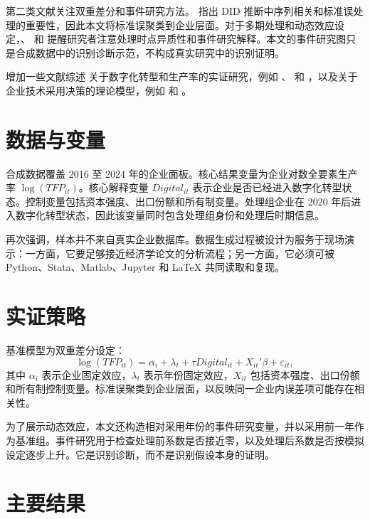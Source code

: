 \documentclass[11pt]{ctexart}
\begin{document}
第二类文献关注双重差分和事件研究方法。\citet{BertrandDufloMullainathan2004} 指出 DID 推断中序列相关和标准误处理的重要性，因此本文将标准误聚类到企业层面。对于多期处理和动态效应设定，\citet{CallawaySantAnna2021}、\citet{SunAbraham2021} 和 \citet{GoodmanBacon2021} 提醒研究者注意处理时点异质性和事件研究解释。本文的事件研究图只是合成数据中的识别诊断示范，不构成真实研究中的识别证明。

增加一些文献综述 关于数字化转型和生产率的实证研究，例如 \citet{BrynjolfssonHitt2000}、\citet{AutorDorn2013} 和 \citet{Bessen2019}，以及关于企业技术采用决策的理论模型，例如 \citet{Rosenberg1982} 和 \citet{Jovanovic1982}。


\section{数据与变量}

合成数据覆盖 2016 至 2024 年的企业面板。核心结果变量为企业对数全要素生产率 $\log(TFP_{it})$。核心解释变量 $Digital_{it}$ 表示企业是否已经进入数字化转型状态。控制变量包括资本强度、出口份额和所有制变量。处理组企业在 2020 年后进入数字化转型状态，因此该变量同时包含处理组身份和处理后时期信息。

再次强调，样本并不来自真实企业数据库。数据生成过程被设计为服务于现场演示：一方面，它要足够接近经济学论文的分析流程；另一方面，它必须可被 Python、Stata、Matlab、Jupyter 和 \LaTeX{} 共同读取和复现。

\section{实证策略}

基准模型为双重差分设定：
\begin{equation}
\log(TFP_{it}) = \alpha_i + \lambda_t + \tau Digital_{it} + X_{it}'\beta + \varepsilon_{it},
\end{equation}
其中 $\alpha_i$ 表示企业固定效应，$\lambda_t$ 表示年份固定效应，$X_{it}$ 包括资本强度、出口份额和所有制控制变量。标准误聚类到企业层面，以反映同一企业内误差项可能存在相关性。

为了展示动态效应，本文还构造相对采用年份的事件研究变量，并以采用前一年作为基准组。事件研究用于检查处理前系数是否接近零，以及处理后系数是否按模拟设定逐步上升。它是识别诊断，而不是识别假设本身的证明。

\section{主要结果}
\end{document}
